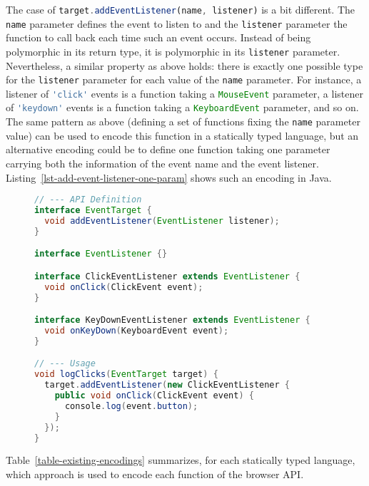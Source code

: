\documentclass{llncs}
\newcommand{\jscode}[1]{\lstinline[language=JavaScript]|#1|}
\begin{document}
The case of \jscode{target.addEventListener(name, listener)} is a bit different. The \jscode{name} parameter defines the event to listen to and the \jscode{listener} parameter the function to call back each time such an event occurs. Instead of being polymorphic in its return type, it is polymorphic in its \jscode{listener} parameter. Nevertheless, a similar property as above holds: there is exactly one possible type for the \jscode{listener} parameter for each value of the \jscode{name} parameter. For instance, a listener of \jscode{'click'} events is a function taking a \jscode{MouseEvent} parameter, a listener of \jscode{'keydown'} events is a function taking a \jscode{KeyboardEvent} parameter, and so on. The same pattern as above (defining a set of functions fixing the \jscode{name} parameter value) can be used to encode this function in a statically typed language, but an alternative encoding could be to define one function taking one parameter carrying both the information of the event name and the event listener. Listing~\ref{lst-add-event-listener-one-param} shows such an encoding in Java.

\begin{figure}
\begin{lstlisting}[label=lst-add-event-listener-one-param,language=Java,caption={Encoding of the \jscode{target.addEventListener(name, listener)} function in Java using one paremeter carrying both the information of the event name and the event listener}]
// --- API Definition
interface EventTarget {
  void addEventListener(EventListener listener);
}

interface EventListener {}

interface ClickEventListener extends EventListener {
  void onClick(ClickEvent event);
}

interface KeyDownEventListener extends EventListener {
  void onKeyDown(KeyboardEvent event);
}

// --- Usage
void logClicks(EventTarget target) {
  target.addEventListener(new ClickEventListener {
    public void onClick(ClickEvent event) {
      console.log(event.button);
    }
  });
}
\end{lstlisting}
\end{figure}

Table~\ref{table-existing-encodings} summarizes, for each statically typed language, which approach is used to encode each function of the browser API.
\end{document}
